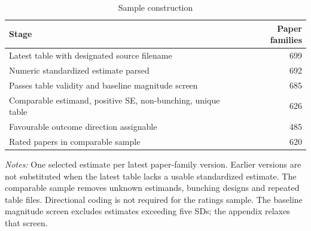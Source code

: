 \begin{table}[htbp]\centering\small
\caption{Sample construction}\label{tab:sample}
\setlength{\tabcolsep}{4pt}
\begin{tabular}{lr}\toprule
Stage & Paper families \\
\midrule
Latest table with designated source filename & 699 \\
Numeric standardized estimate parsed & 692 \\
Passes table validity and baseline magnitude screen & 685 \\
Comparable estimand, positive SE, non-bunching, unique table & 626 \\
Favourable outcome direction assignable & 485 \\
Rated papers in comparable sample & 620 \\
\bottomrule\end{tabular}
\par\vspace{4pt}\begin{minipage}{\textwidth}\footnotesize
\textit{Notes:} One selected estimate per latest paper-family version. Earlier versions are not substituted when the latest table lacks a usable standardized estimate. The comparable sample removes unknown estimands, bunching designs and repeated table files. Directional coding is not required for the ratings sample. The baseline magnitude screen excludes estimates exceeding five SDs; the appendix relaxes that screen.
\end{minipage}
\end{table}
